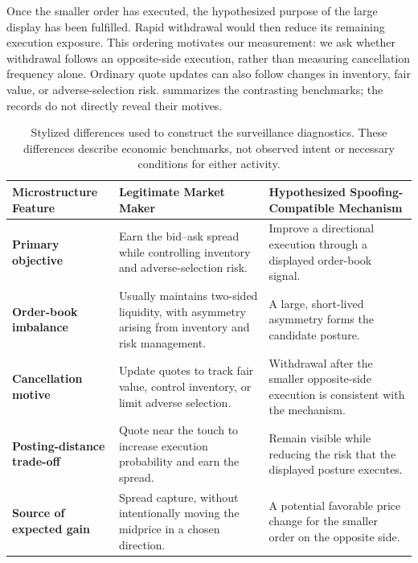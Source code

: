 \documentclass[11pt]{article}
\begin{document}
Once the smaller order has executed, the hypothesized purpose of the large display has been fulfilled. Rapid withdrawal would then reduce its remaining execution exposure. This ordering motivates our measurement: we ask whether withdrawal follows an opposite-side execution, rather than measuring cancellation frequency alone. Ordinary quote updates can also follow changes in inventory, fair value, or adverse-selection risk.  summarizes the contrasting benchmarks; the records do not directly reveal their motives.

\begin{table}[htbp]
\centering
\caption{Stylized differences used to construct the surveillance diagnostics. These differences describe economic
benchmarks, not observed intent or necessary conditions for either activity.}
\label{tab:surveillance-models}
\renewcommand{\arraystretch}{1.4}
\setlength{\tabcolsep}{8pt}

\begin{tabularx}{\textwidth}{
    >{\raggedright\arraybackslash\bfseries}p{}
    >{\raggedright\arraybackslash}X
    >{\raggedright\arraybackslash}X
}
\toprule
\rowcolor{gray!15}
\textbf{Microstructure Feature} & \textbf{Legitimate Market Maker} & \textbf{Hypothesized Spoofing-Compatible Mechanism} \\
\midrule
Primary objective
& Earn the bid--ask spread while controlling inventory and adverse-selection risk.
& Improve a directional execution through a displayed order-book signal. \\

Order-book imbalance
& Usually maintains two-sided liquidity, with asymmetry arising from inventory and risk management.
& A large, short-lived asymmetry forms the candidate posture. \\

Cancellation motive
& Update quotes to track fair value, control inventory, or limit adverse selection.
& Withdrawal after the smaller opposite-side execution is consistent with the mechanism. \\

Posting-distance trade-off
& Quote near the touch to increase execution probability and earn the spread.
& Remain visible while reducing the risk that the displayed posture executes. \\

Source of expected gain
& Spread capture, without intentionally moving the midprice in a chosen direction.
& A potential favorable price change for the smaller order on the opposite side. \\
\bottomrule
\end{tabularx}
\end{table}
\end{document}
